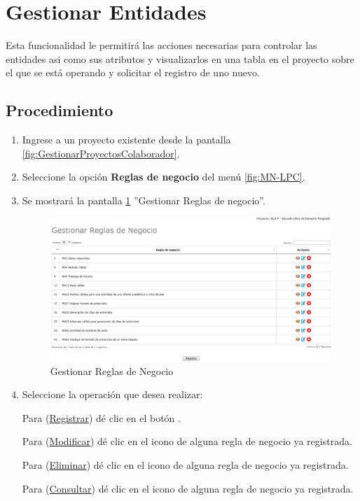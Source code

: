 \hypertarget{cv:gestionarEntidades}{\section{Gestionar Entidades}} \label{sec:GestionarEntidades}

	Esta funcionalidad le permitirá las acciones necesarias para controlar las entidades asi como sus atributos y visualizarlos en una tabla en el proyecto sobre el que se está operando y solicitar el registro de uno nuevo.

		\subsection{Procedimiento}

			\begin{enumerate}
				
			\item Ingrese a un proyecto existente desde la pantalla \ref{fig:GestionarProyectosColaborador}.
	
			\item Seleccione la opción \textbf{Reglas de negocio} del menú \ref{fig:MN-LPC}.
	
			\item Se mostrará la pantalla \ref{fig:GestionarBR} ''Gestionar Reglas de negocio''.

			\begin{figure}[h!]
				\begin{center}
					\includegraphics[scale=0.5]{roles/lider/reglasNegocio/pantallas/IU8gestionarBR}
					\caption{Gestionar Reglas de Negocio}
					\label{fig:GestionarBR}
				\end{center}
			\end{figure}
		
				\item Seleccione la operación que desea realizar:
			
			Para (\hyperlink{cv:registrarBR}{Registrar}) dé clic en el botón \IURegistrar.
			
			Para (\hyperlink{cv:modificarBR}{Modificar}) dé clic en el icono \IUEditar{} de alguna regla de negocio ya registrada.
			
			Para (\hyperlink{cv:eliminarEntidad}{Eliminar}) dé clic en el icono \IUBotonEliminar{} de alguna regla de negocio ya registrada.
			
			Para (\hyperlink{cv:consultarEntidad}{Consultar}) dé clic en el icono \IUConsultar{} de alguna regla de negocio ya registrada.
			\end{enumerate}